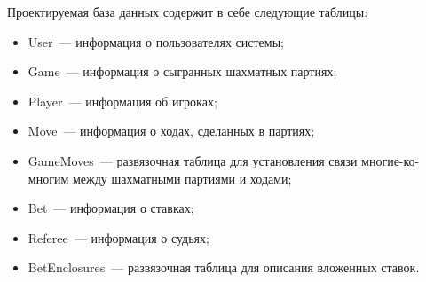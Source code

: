 Проектируемая база данных содержит в себе следующие таблицы:
\begin{itemize}
	\item User~--- информация о пользователях системы;
	\item Game~--- информация о сыгранных шахматных партиях;
	\item Player~--- информация об игроках;
	\item Move~--- информация о ходах, сделанных в партиях;
	\item GameMoves~--- развязочная таблица для установления связи многие-ко-многим между шахматными партиями и ходами;
	\item Bet~--- информация о ставках;
	\item Referee~--- информация о судьях;
	\item BetEnclosures~--- развязочная таблица для описания вложенных ставок.
\end{itemize}

